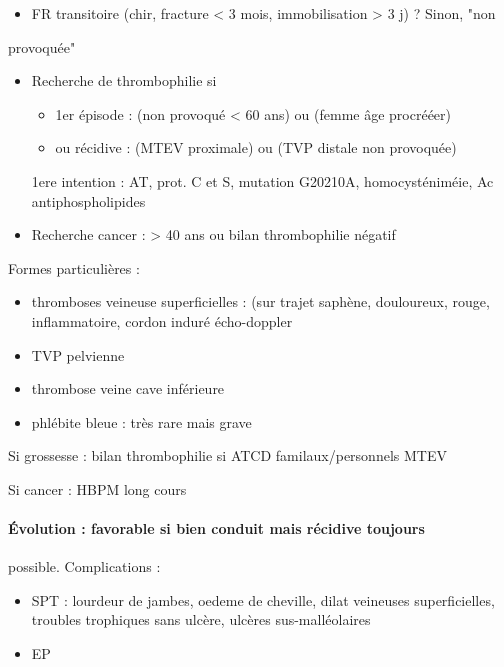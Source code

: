 \documentclass[11pt]{article}
\begin{document}
\begin{itemize}
\item FR transitoire (chir, fracture < 3 mois, immobilisation > 3 j) ? Sinon, "non
\end{itemize}
provoquée"
\begin{itemize}
\item Recherche de thrombophilie si

\begin{itemize}
\item 1er épisode :  (non provoqué < 60 ans) ou (femme âge procrééer)
\item ou récidive : (MTEV proximale) ou (TVP distale non provoquée)
\end{itemize}

\thus 1ere intention : \gls{AT}, prot. C et S, mutation G20210A,
homocysténiméie, Ac antiphospholipides
\item Recherche cancer : > 40 ans ou bilan thrombophilie négatif
\end{itemize}


Formes particulières :

\begin{itemize}
\item thromboses veineuse superficielles : (sur trajet saphène, douloureux,
rouge, inflammatoire, cordon induré \thus écho-doppler
\item TVP pelvienne
\item thrombose veine cave inférieure
\item phlébite bleue : très rare mais grave
\end{itemize}


Si grossesse : bilan thrombophilie si ATCD familaux/personnels MTEV

Si cancer : HBPM long cours

\paragraph{Évolution : favorable si bien conduit mais récidive toujours}
\label{sec:orgfe60df4}
possible. Complications : 

\begin{itemize}
\item SPT : lourdeur de jambes, oedeme de cheville, dilat veineuses
superficielles, troubles trophiques sans ulcère, ulcères sus-malléolaires
\item EP
\end{itemize}
\end{document}
